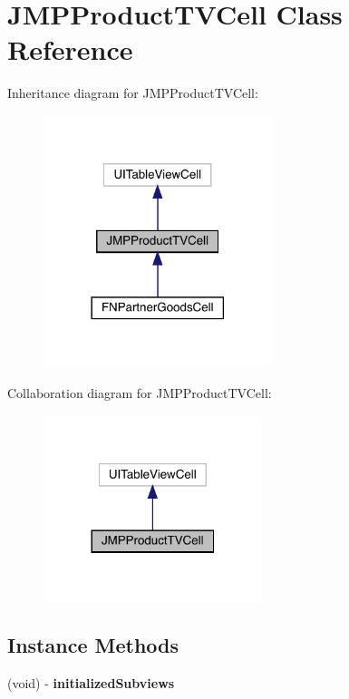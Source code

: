 \hypertarget{interface_j_m_p_product_t_v_cell}{}\section{J\+M\+P\+Product\+T\+V\+Cell Class Reference}
\label{interface_j_m_p_product_t_v_cell}


Inheritance diagram for J\+M\+P\+Product\+T\+V\+Cell\+:\nopagebreak
\begin{figure}[H]
\begin{center}
\leavevmode
\includegraphics[width=189pt]{interface_j_m_p_product_t_v_cell__inherit__graph}
\end{center}
\end{figure}


Collaboration diagram for J\+M\+P\+Product\+T\+V\+Cell\+:\nopagebreak
\begin{figure}[H]
\begin{center}
\leavevmode
\includegraphics[width=180pt]{interface_j_m_p_product_t_v_cell__coll__graph}
\end{center}
\end{figure}
\subsection*{Instance Methods}
\begin{DoxyCompactItemize}
\item 
\mbox{\label{interface_j_m_p_product_t_v_cell_a7fce1e623b2e1b26524dec6fc68236a7}} 
(void) -\/ {\bfseries initialized\+Subviews}
\end{DoxyCompactItemize}
